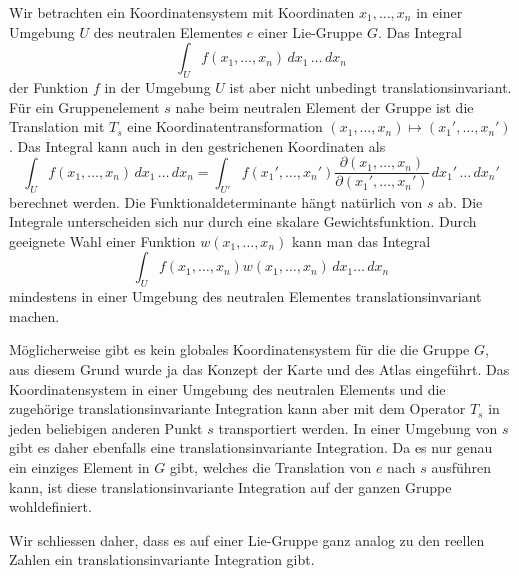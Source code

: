 Wir betrachten ein Koordinatensystem mit Koordinaten $x_1,\dots,x_n$
in einer Umgebung $U$ des neutralen Elementes $e$ einer Lie-Gruppe $G$.
Das Integral
\[
\int_{U} f(x_1,\dots,x_n) \,dx_1\,\dots\,dx_n
\]
der Funktion $f$ in der Umgebung $U$ ist aber nicht unbedingt
translationsinvariant.
Für ein Gruppenelement $s$ nahe beim neutralen Element der Gruppe
ist die Translation mit $T_s$ eine Koordinatentransformation
$(x_1,\dots,x_n)\mapsto (x_1',\dots,x_n')$.
Das Integral kann auch in den gestrichenen Koordinaten als
\[
\int_{U} f(x_1,\dots,x_n) \,dx_1\,\dots\,dx_n
=
\int_{U'} f(x_1',\dots,x_n')
\frac{\partial (x_1,\dots,x_n)}{\partial(x_1',\dots,x_n')}
\,dx_1'\,\dots\,dx_n'
\]
berechnet werden.
Die Funktionaldeterminante hängt natürlich von $s$ ab.
Die Integrale unterscheiden sich nur durch eine skalare Gewichtsfunktion.
Durch geeignete Wahl einer Funktion $w(x_1,\dots,x_n)$ kann man 
das Integral
\[
\int_{U} f(x_1,\dots,x_n) w(x_1,\dots,x_n)\,dx_1\dots\,dx_n
\]
mindestens in einer Umgebung des neutralen Elementes
translationsinvariant machen.

Möglicherweise gibt es kein globales Koordinatensystem für die 
die Gruppe $G$, aus diesem Grund wurde ja das Konzept der Karte
und des Atlas eingeführt.
Das Koordinatensystem in einer Umgebung des neutralen Elements und
die zugehörige translationsinvariante Integration kann aber mit
dem Operator $T_s$ in jeden beliebigen anderen Punkt $s$ transportiert
werden.
In einer Umgebung von $s$ gibt es daher ebenfalls eine
translationsinvariante Integration.
Da es nur genau ein einziges Element in $G$ gibt, welches die Translation
von $e$ nach $s$ ausführen kann, ist diese translationsinvariante 
Integration auf der ganzen Gruppe wohldefiniert.

Wir schliessen daher, dass es auf einer Lie-Gruppe ganz analog 
zu den reellen Zahlen ein translationsinvariante Integration
gibt.

